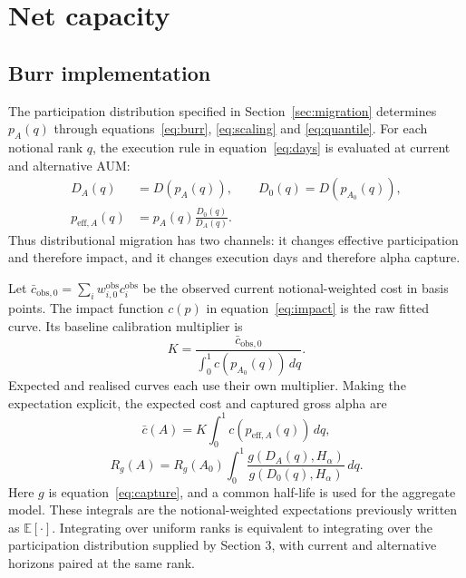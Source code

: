 \documentclass[11pt,a4paper]{article}
\numberwithin{equation}{section}
\begin{document}
\section{Net capacity}\label{sec:net}
\subsection{Burr implementation}
The participation distribution specified in Section~\ref{sec:migration} determines $p_A(q)$
through equations~\eqref{eq:burr}, \eqref{eq:scaling} and \eqref{eq:quantile}.
For each notional rank $q$, the execution rule in equation~\eqref{eq:days} is evaluated
at current and alternative AUM:
\begin{equation}\label{eq:paired}
 \begin{aligned}
 D_A(q)&=D\!\left(p_A(q)\right),\qquad D_0(q)=D\!\left(p_{A_0}(q)\right),\\
 p_{\mathrm{eff},A}(q)&=p_A(q)\frac{D_0(q)}{D_A(q)}.
 \end{aligned}
\end{equation}
Thus distributional migration has two channels: it changes effective participation and
therefore impact, and it changes execution days and therefore alpha capture.

Let $\bar c_{\mathrm{obs},0}=\sum_i w_{i,0}^{\mathrm{obs}}c_i^{\mathrm{obs}}$ be the observed
current notional-weighted cost in basis points. The impact function $c(p)$ in
equation~\eqref{eq:impact} is the raw fitted curve. Its baseline calibration multiplier is
\begin{equation}\label{eq:calibration}
 K=\frac{\bar c_{\mathrm{obs},0}}
 {\displaystyle\int_0^1 c\!\left(p_{A_0}(q)\right)\,dq}.
\end{equation}
Expected and realised curves each use their own multiplier. Making the expectation explicit,
the expected cost and captured gross alpha are
\begin{equation}\label{eq:costexpectation}
 \bar c(A)=K\int_0^1 c\!\left(p_{\mathrm{eff},A}(q)\right)\,dq,
\end{equation}
\begin{equation}\label{eq:alphaexpectation}
 R_g(A)=R_g(A_0)\int_0^1
 \frac{g(D_A(q),H_\alpha)}{g(D_0(q),H_\alpha)}\,dq.
\end{equation}
Here $g$ is equation~\eqref{eq:capture}, and a common half-life is used for the aggregate
model. These integrals are the notional-weighted expectations previously written as
$\mathbb E[\cdot]$. Integrating over uniform ranks is equivalent to integrating over the
participation distribution supplied by Section 3, with current and alternative horizons
paired at the same rank.
\end{document}
